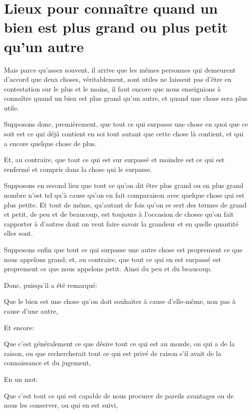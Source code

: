 
\section{Lieux pour connaître quand un bien est plus grand ou plus petit qu'un autre}

Mais parce qu'assez souvent, il arrive que les mêmes personnes qui demeurent d'accord que deux choses,
véritablement, sont utiles ne laissent pas d'être en contestation sur le plus et le moins, il faut encore
que nous enseignions à connaître quand un bien est plus grand qu'un autre, et quand une chose sera plus
utile. 

Supposons donc, premièrement, que tout ce qui surpasse une chose en quoi que ce soit est ce qui déjà contient
en soi tout autant que cette chose là contient, et qui a encore quelque chose de plus.

Et, au contraire, que tout ce qui est sur surpassé et moindre est ce qui est renfermé et compris dans la chose
qui le surpasse.

Supposons en second lieu que tout ce qu'on dit être plus grand ou en plus grand nombre n'est tel qu'à cause
qu'on en fait comparaison avec quelque chose qui est plus petite. Et tout de même, qu'autant de fois qu'on
se sert des termes de grand et petit, de peu et de beaucoup, est toujours à l'occasion de choses qu'on fait
rapporter à d'autres dont on veut faire savoir la grandeur et en quelle quantité elles sont.

Supposons enfin que tout ce qui surpasse une autre chose est proprement ce que nous appelons grand; et, au
contraire, que tout ce qui en est surpassé est proprement ce que nous appelons petit. Ainsi du peu et du
beaucoup.

\bigbreak

Donc, puisqu'il a été remarqué:

\begin{emphpar}
	Que le bien est une chose qu'on doit souhaiter à cause d'elle-même, non pas à cause d'une autre,
\end{emphpar}

Et encore:

\begin{emphpar}
	Que c'est généralement ce que désire tout ce qui est au monde, ou qui a de la raison, ou que rechercherait
	tout ce qui est privé de raison s'il avait de la connaissance et du jugement,
\end{emphpar}

En un mot:

\begin{emphpar}
	Que c'est tout ce qui est capable de nous procurer de pareils avantages ou de nous les conserver, ou qui
	en est suivi,
\end{emphpar}


